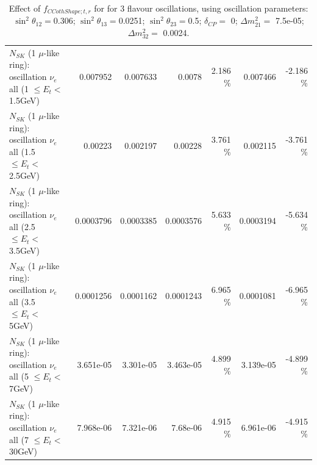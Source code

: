 \begin{table}
\begin{tabular}{| l | r | r | r  r | r  r |}
$N_{SK}$ (1 $\mu$-like ring): oscillation $\nu_{e}$ all (1 $\leq E_{t} <$ 1.5GeV) &        0.007952 &        0.007633 &          0.0078 &    2.186 \%  &        0.007466 &   -2.186 \%  \\ 
$N_{SK}$ (1 $\mu$-like ring): oscillation $\nu_{e}$ all (1.5 $\leq E_{t} <$ 2.5GeV) &         0.00223 &        0.002197 &         0.00228 &    3.761 \%  &        0.002115 &   -3.761 \%  \\ 
$N_{SK}$ (1 $\mu$-like ring): oscillation $\nu_{e}$ all (2.5 $\leq E_{t} <$ 3.5GeV) &       0.0003796 &       0.0003385 &       0.0003576 &    5.633 \%  &       0.0003194 &   -5.634 \%  \\ 
$N_{SK}$ (1 $\mu$-like ring): oscillation $\nu_{e}$ all (3.5 $\leq E_{t} <$ 5GeV) &       0.0001256 &       0.0001162 &       0.0001243 &    6.965 \%  &       0.0001081 &   -6.965 \%  \\ 
 $N_{SK}$ (1 $\mu$-like ring): oscillation $\nu_{e}$ all (5 $\leq E_{t} <$ 7GeV) &       3.651e-05 &       3.301e-05 &       3.463e-05 &    4.899 \%  &       3.139e-05 &   -4.899 \%  \\ 
$N_{SK}$ (1 $\mu$-like ring): oscillation $\nu_{e}$ all (7 $\leq E_{t} <$ 30GeV) &       7.968e-06 &       7.321e-06 &        7.68e-06 &    4.915 \%  &       6.961e-06 &   -4.915 \%  \\ 
\hline
\hline
\end{tabular}
\caption{ Effect of $f_{CCothShape; t, r}$ for for 3 flavour oscillations, using oscillation parameters:  $\sin^2\theta_{12} = $0.306; $\sin^2\theta_{13} = $0.0251; $\sin^2\theta_{23} = $0.5; $\delta_{CP} = $        0; $\Delta m^2_{21} = $    7.5e-05; $\Delta m^2_{32} = $    0.0024. }
\label{tab:num_xsec_shape_ccoth_1RmuT_3f_osc_t13:0.0251}
\end{table}
\clearpage
